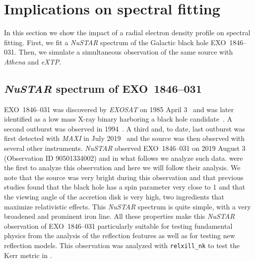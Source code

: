 \documentclass[twocolumn]{emulateapj}
\begin{document}





\section{Implications on spectral fitting} \label{s-app}

In this section we show the impact of a radial electron density profile on spectral fitting. First, we fit a \textsl{NuSTAR} spectrum of the Galactic black hole EXO~1846--031. Then, we simulate a simultaneous observation of the same source with \textsl{Athena} and \textsl{eXTP}.  



\subsection{\textsl{NuSTAR} spectrum of EXO~1846--031}

EXO~1846--031 was discovered by \textsl{EXOSAT} on 1985 April 3~\citep{1985IAUC.4051....1P} and was later identified as a low mass X-ray binary harboring a black hole candidate~\citep{1993A&A...279..179P}. A second outburst was observed in 1994~\citep{1994IAUC.6096....1Z}. A third and, to date, last outburst was first detected with \textsl{MAXI} in July 2019~\citep{2019ATel12968....1N} and the source was then observed with several other instruments. \textsl{NuSTAR} observed EXO~1846--031 on 2019 August 3 (Observation ID 90501334002) and in what follows we analyze such data. \citet{2020ApJ...900...78D} were the first to analyze this observation and here we will follow their analysis. We note that the source was very bright during this observation and that previous studies found that the black hole has a spin parameter very close to 1 and that the viewing angle of the accretion disk is very high, two ingredients that maximize relativistic effects. This \textsl{NuSTAR} spectrum is quite simple, with a very broadened and prominent iron line. All these properties make this \textsl{NuSTAR} observation of EXO~1846--031 particularly suitable for testing fundamental physics from the analysis of the reflection features as well as for testing new reflection models. This observation was analyzed with {\tt relxill\_nk} to test the Kerr metric in \citet{2021ApJ...913...79T}.
\end{document}
